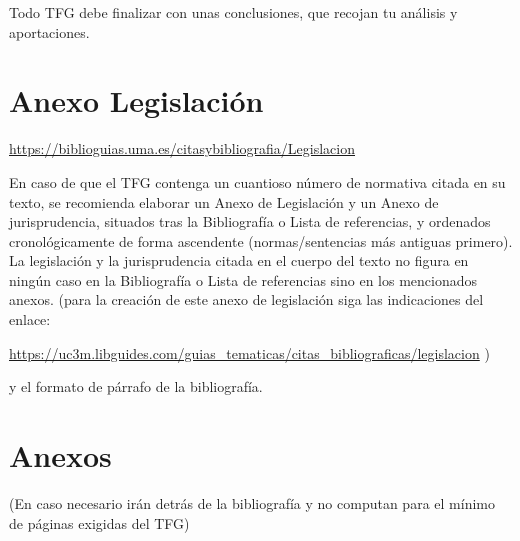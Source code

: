 \documentclass[13pt,a4paper]{report}
\begin{document}
Todo TFG debe finalizar con unas conclusiones, que recojan tu análisis y aportaciones.



\renewcommand{\bibname}{\fontsize{16}{20}\selectfont Bibliografía} %
\renewcommand{\bibfont}{\fontsize{13}{15}\selectfont} %

\section{Anexo Legislación}

\vspace{12pt}

\href{https://biblioguias.uma.es/citasybibliografia/Legislacion}{https://biblioguias.uma.es/citasybibliografia/Legislacion} 

\vspace{12pt}

En caso de que el TFG contenga un cuantioso número de normativa citada en su texto, se recomienda elaborar un Anexo de Legislación y un Anexo de jurisprudencia, situados tras la Bibliografía o Lista de referencias, y ordenados cronológicamente de forma ascendente (normas/sentencias más antiguas primero). La legislación y la jurisprudencia citada en el cuerpo del texto no figura en ningún caso en la Bibliografía o Lista de referencias sino en los mencionados anexos.
(para la creación de este anexo de legislación siga las indicaciones del enlace:

\vspace{12pt}

\href{https://uc3m.libguides.com/guias\_tematicas/citas\_bibliograficas/legislacion}{https://uc3m.libguides.com/guias\_tematicas/citas\_bibliograficas/legislacion}
 ) 

 \vspace{12pt}

y el formato de párrafo de la bibliografía.

\vspace{12pt}

\section{Anexos}

(En caso necesario irán detrás de la bibliografía y no computan para el mínimo de páginas exigidas del TFG)
\end{document}
